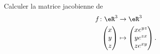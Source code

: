 
\begin{exercice}\label{exoOutilsMath-0137}

Calculer la matrice jacobienne de 
\begin{equation}
    \begin{aligned}
        f\colon \eR^3&\to \eR^3 \\
        \begin{pmatrix}
            x    \\ 
            y    \\ 
            z    
        \end{pmatrix}&\mapsto \begin{pmatrix}
            x e^{yz}    \\ 
            ye^{zx}    \\ 
            ze^{xy}    
        \end{pmatrix}.
    \end{aligned}
\end{equation}


\end{exercice}
